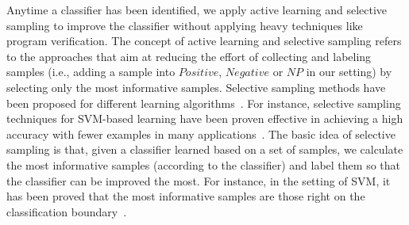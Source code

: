 Anytime a classifier has been identified, we apply active learning and selective sampling to improve the classifier without applying heavy techniques like program verification.
The concept of active learning and selective sampling refers to the approaches that aim at reducing the effort of collecting and labeling samples (i.e., adding a sample into $\mathit{Positive}$, $\mathit{Negative}$ or $\mathit{NP}$ in our setting) by selecting only the most informative samples. Selective sampling methods have been proposed for different learning algorithms~\cite{DBLP:conf/icml/OrabonaC11}.
For instance, selective sampling techniques for SVM-based learning have been proven effective in achieving a
high accuracy with fewer examples in many applications~\cite{DBLP:conf/icml/OrabonaC11,DBLP:conf/mm/TongC01,DBLP:journals/jmlr/TongK01}.
The basic idea of selective sampling is that, given a classifier learned based on a set of samples, we calculate the most informative samples (according to the classifier) and label them so that the classifier can be improved the most.
For instance, in the setting of SVM, it has been proved that the most informative samples are those right on the classification boundary~\cite{DBLP:conf/icml/OrabonaC11}.
